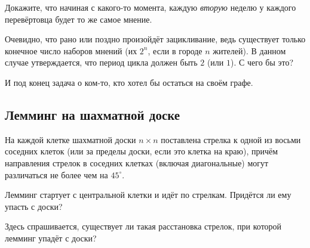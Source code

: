 Докажите, что начиная с какого-то момента, каждую \emph{вторую} неделю у каждого перевёртовца будет то же самое мнение.

Очевидно, что рано или поздно произойдёт зацикливание, ведь существует только конечное число наборов мнений (их $2^n$, если в городе $n$ жителей). 
В данном случае утверждается, что период цикла должен быть $2$ (или $1$).
С чего бы это?

\medskip

И под конец задача о ком-то, кто хотел бы остаться на своём графе.

\subsection*{Лемминг на шахматной доске}\label{Лемминг на шахматной доске}

На каждой клетке шахматной доски $n\times n$ поставлена стрелка к одной из  восьми соседних клеток (или за пределы доски, если это клетка на краю),
причём направления стрелок в соседних клетках (включая диагональные) могут различаться не более чем на $45^\circ$.

Лемминг стартует с центральной клетки и идёт по стрелкам.
Придётся ли ему упасть с доски?

\begin{addedbytheeditors}
Здесь спрашивается, существует ли такая расстановка стрелок, при которой лемминг упадёт с доски? 
\end{addedbytheeditors}